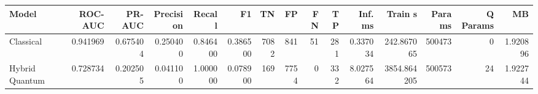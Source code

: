 \begin{table}[ht]
\centering
\begin{tabular}{lrrrrrrrrrrrrrr}
\toprule
Model & ROC-AUC & PR-AUC & Precision & Recall & F1 & TN & FP & FN & TP & Inf. ms & Train s & Params & Q Params & MB \\
\midrule
Classical & 0.941969 & 0.675404 & 0.250400 & 0.846400 & 0.386500 & 7082 & 841 & 51 & 281 & 0.337034 & 242.867065 & 500473 & 0 & 1.920896 \\
Hybrid Quantum & 0.728734 & 0.202505 & 0.041100 & 1.000000 & 0.078900 & 169 & 7754 & 0 & 332 & 8.027564 & 3854.864205 & 500573 & 24 & 1.922744 \\
\bottomrule
\end{tabular}
\end{table}
